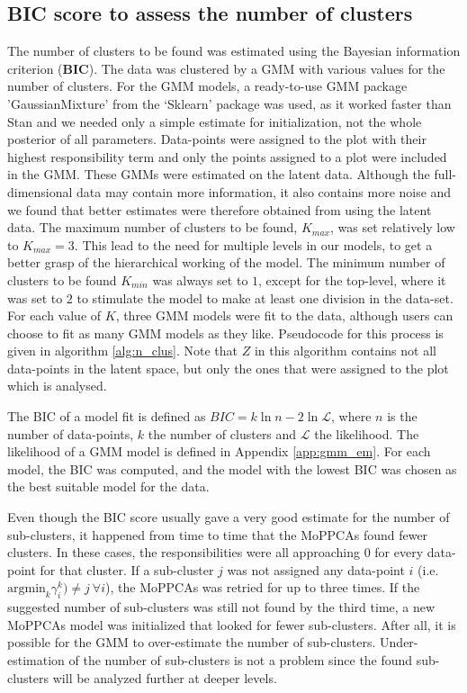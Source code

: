 \subsection{BIC score to assess the number of clusters}\label{sec:n_clus}
The number of clusters to be found was estimated using the Bayesian information criterion (\textbf{BIC}). The data was clustered by a GMM with various values for the number of clusters. For the GMM models, a ready-to-use GMM package 'GaussianMixture' from the `Sklearn' package was used, as it worked faster than Stan and we needed only a simple estimate for initialization, not the whole posterior of all parameters. Data-points were assigned to the plot with their highest responsibility term and only the points assigned to a plot were included in the GMM. These GMMs were estimated on the latent data. Although the full-dimensional data may contain more information, it also contains more noise and we found that better estimates were therefore obtained from using the latent data. The maximum number of clusters to be found, $K_{max}$, was set relatively low to $K_{max} = 3$. This lead to the need for multiple levels in our models, to get a better grasp of the hierarchical working of the model. The minimum number of clusters to be found $K_{min}$ was always set to $1$, except for the top-level, where it was set to $2$ to stimulate the model to make at least one division in the data-set. For each value of $K$, three GMM models were fit to the data, although users can choose to fit as many GMM models as they like. Pseudocode for this process is given in algorithm \ref{alg:n_clus}. Note that $Z$ in this algorithm contains not all data-points in the latent space, but only the ones that were assigned to the plot which is analysed. 

The BIC of a model fit is defined as $BIC = k \ln{n} - 2 \ln{\mathcal{L}}$, where $n$ is the number of data-points, $k$ the number of clusters and $\mathcal{L}$ the likelihood. The likelihood of a GMM model is defined in Appendix \ref{app:gmm_em}. For each model, the BIC was computed, and the model with the lowest BIC was chosen as the best suitable model for the data.

Even though the BIC score usually gave a very good estimate for the number of sub-clusters, it happened from time to time that the MoPPCAs found fewer clusters. In these cases, the responsibilities were all approaching $0$ for every data-point for that cluster. If a sub-cluster $j$ was not assigned any data-point $i$ (i.e. $\text{argmin}_k \gamma^k_i) \neq j~\forall i$), the MoPPCAs was retried for up to three times. If the suggested number of sub-clusters was still not found by the third time, a new MoPPCAs model was initialized that looked for fewer sub-clusters. After all, it is possible for the GMM to over-estimate the number of sub-clusters. Under-estimation of the number of sub-clusters is not a problem since the found sub-clusters will be analyzed further at deeper levels.


